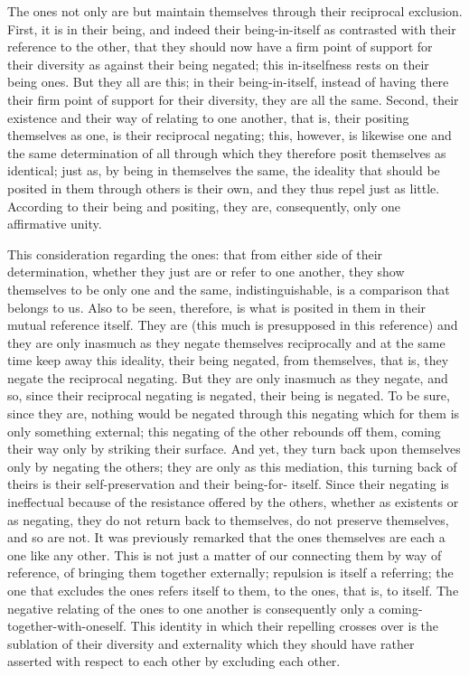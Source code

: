 The ones not only are but maintain themselves
through their reciprocal exclusion.
First, it is in their being,
and indeed their being-in-itself as
contrasted with their reference to the other,
that they should now have a firm point of support
for their diversity as against their being negated;
this in-itselfness rests on their being ones.
But they all are this;
in their being-in-itself,
instead of having there their
firm point of support for their diversity,
they are all the same.
Second, their existence and their
way of relating to one another,
that is, their positing themselves as one,
is their reciprocal negating;
this, however, is likewise one and the same determination of
all through which they therefore posit themselves as identical;
just as, by being in themselves the same,
the ideality that should be posited in them
through others is their own,
and they thus repel just as little.
According to their being and positing,
they are, consequently, only one affirmative unity.

This consideration regarding the ones:
that from either side of their determination,
whether they just are or refer to one another,
they show themselves to be only one and the same,
indistinguishable, is a comparison that belongs to us.
Also to be seen, therefore, is what is posited in them
in their mutual reference itself.
They are (this much is presupposed in this reference)
and they are only inasmuch as
they negate themselves reciprocally
and at the same time keep away this ideality,
their being negated, from themselves, that is,
they negate the reciprocal negating.
But they are only inasmuch as they negate,
and so, since their reciprocal negating is negated,
their being is negated.
To be sure, since they are,
nothing would be negated through this negating
which for them is only something external;
this negating of the other rebounds off them,
coming their way only by striking their surface.
And yet, they turn back upon themselves
only by negating the others;
they are only as this mediation,
this turning back of theirs is their self-preservation
and their being-for- itself.
Since their negating is ineffectual
because of the resistance offered by the others,
whether as existents or as negating,
they do not return back to themselves,
do not preserve themselves, and so are not.
It was previously remarked that
the ones themselves are each a one like any other.
This is not just a matter of our
connecting them by way of reference,
of bringing them together externally;
repulsion is itself a referring;
the one that excludes the ones refers itself to them,
to the ones, that is, to itself.
The negative relating of the ones to one another is consequently
only a coming-together-with-oneself.
This identity in which their repelling crosses over is
the sublation of their diversity and externality
which they should have rather asserted with respect to
each other by excluding each other.

